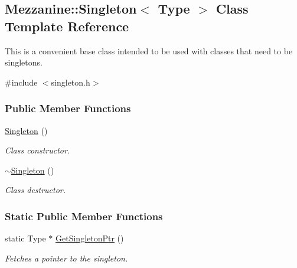 \hypertarget{classMezzanine_1_1Singleton}{
\subsection{Mezzanine::Singleton$<$ Type $>$ Class Template Reference}
\label{classMezzanine_1_1Singleton}
}


This is a convenient base class intended to be used with classes that need to be singletons.  




{\ttfamily \#include $<$singleton.h$>$}

\subsubsection*{Public Member Functions}
\begin{DoxyCompactItemize}
\item 
\hypertarget{classMezzanine_1_1Singleton_a7174af94e201bdaeab717cdbcbb2e565}{
\hyperlink{classMezzanine_1_1Singleton_a7174af94e201bdaeab717cdbcbb2e565}{Singleton} ()}
\label{classMezzanine_1_1Singleton_a7174af94e201bdaeab717cdbcbb2e565}

\begin{DoxyCompactList}\small\item\em Class constructor. \item\end{DoxyCompactList}\item 
\hypertarget{classMezzanine_1_1Singleton_a5e45fc3969b0fae3d095676cc515da1d}{
\hyperlink{classMezzanine_1_1Singleton_a5e45fc3969b0fae3d095676cc515da1d}{$\sim$Singleton} ()}
\label{classMezzanine_1_1Singleton_a5e45fc3969b0fae3d095676cc515da1d}

\begin{DoxyCompactList}\small\item\em Class destructor. \item\end{DoxyCompactList}\end{DoxyCompactItemize}
\subsubsection*{Static Public Member Functions}
\begin{DoxyCompactItemize}
\item 
static Type $\ast$ \hyperlink{classMezzanine_1_1Singleton_a78fc425584913f0b2c615ec440871a67}{GetSingletonPtr} ()
\begin{DoxyCompactList}\small\item\em Fetches a pointer to the singleton. \item\end{DoxyCompactList}\end{DoxyCompactItemize}
